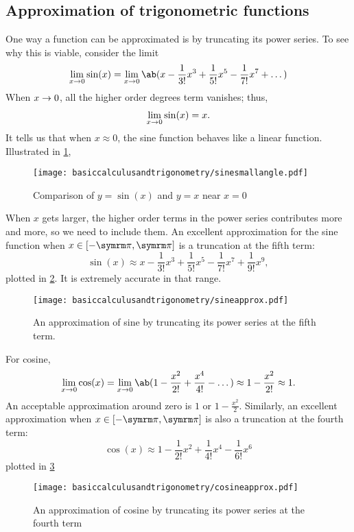 \subsection{Approximation of trigonometric functions}

One way a function can be approximated is by truncating its power series. To see why this is viable, consider the limit
\begin{align}
	\lim_{x \appr 0}\sin(x) = \lim_{x \appr 0}\ab(x - \frac{1}{3!}x^3 + \frac{1}{5!}x^5 - \frac{1}{7!}x^7 + \dots)
\end{align}
When $x \rightarrow 0$, all the higher order degrees term vanishes; thus, 
\begin{gather}
	\lim_{x \rightarrow 0}\sin(x) = x.
\end{gather}
It tells us that when $x \approx 0$, the sine function behaves like a linear function. Illustrated in \cref{fig:sine_small_angle},

\begin{figure}[ht]
	\centering
	\texttt{[image: basiccalculusandtrigonometry/sinesmallangle.pdf]}
	\caption{Comparison of $y = \sin(x)$ and $y = x$ near $x = 0$}
	\label{fig:sine_small_angle}
\end{figure}
When $x$ gets larger, the higher order terms in the power series contributes more and more, so we need to include them. An excellent approximation for the sine function when $x \in [-\cpi, \cpi]$ is a truncation at the fifth term:
\begin{equation}
	\sin(x) \approx x - \frac{1}{3!}x^3 + \frac{1}{5!}x^5 - \frac{1}{7!}x^7 + \frac{1}{9!}x^9,
\end{equation}
plotted in \cref{fig:sine_approximation}. It is extremely accurate in that range.
\begin{figure}
	\centering
	\texttt{[image: basiccalculusandtrigonometry/sineapprox.pdf]}
	\caption{An approximation of sine by truncating its power series at the fifth term.}
	\label{fig:sine_approximation}
\end{figure}

For cosine,
\begin{align}
	\lim_{x \appr 0}\cos(x) = \lim_{x \appr 0}\ab(1 - \frac{x^2}{2!} + \frac{x^4}{4!} - \dots) \approx 1 - \frac{x^2}{2!} \approx 1.
\end{align}
An acceptable approximation around zero is $1$ or $1 - \frac{x^2}{2}$. Similarly, an excellent approximation when $x \in [-\cpi, \cpi]$ is also a truncation at the fourth term:
\begin{equation}
	\cos(x) \approx 1 - \frac{1}{2!}x^2 + \frac{1}{4!}x^4 - \frac{1}{6!}x^6 
\end{equation}
plotted in \cref{fig:cosine_approximation}
\begin{figure}
	\centering
	\texttt{[image: basiccalculusandtrigonometry/cosineapprox.pdf]}
	\caption{An approximation of cosine by truncating its power series at the fourth term}
	\label{fig:cosine_approximation}
\end{figure}

